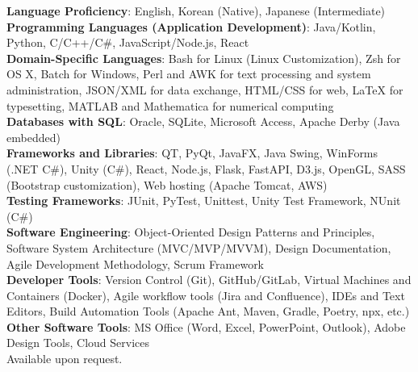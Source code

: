 \textbf{Language Proficiency}: English, Korean (Native), Japanese (Intermediate)\\
\textbf{Programming Languages (Application Development)}: Java/Kotlin, Python, C/C++/C\#, JavaScript/Node.js, React\\
\textbf{Domain-Specific Languages}: Bash for Linux (Linux Customization), Zsh for OS X, Batch for Windows, 
Perl and AWK for text processing and system administration, 
JSON/XML for data exchange, HTML/CSS for web, 
LaTeX for typesetting, MATLAB and Mathematica for numerical computing\\
\textbf{Databases with SQL}: Oracle, SQLite, Microsoft Access, Apache Derby (Java embedded)\\
\textbf{Frameworks and Libraries}: 
QT, PyQt, JavaFX, Java Swing, WinForms (.NET C\#), Unity (C\#), 
React, Node.js, Flask, FastAPI, D3.js, OpenGL, 
SASS (Bootstrap customization), Web hosting (Apache Tomcat, AWS)\\
\textbf{Testing Frameworks}: JUnit, PyTest, 
Unittest, Unity Test Framework, NUnit (C\#)\\
\textbf{Software Engineering}: 
Object-Oriented Design Patterns and Principles, 
Software System Architecture (MVC/MVP/MVVM), Design Documentation, 
Agile Development Methodology, Scrum Framework\\
\textbf{Developer Tools}: Version Control (Git), GitHub/GitLab, 
Virtual Machines and Containers (Docker), 
Agile workflow tools (Jira and Confluence), 
IDEs and Text Editors, 
Build Automation Tools (Apache Ant, Maven, Gradle, Poetry, npx, etc.)\\
\textbf{Other Software Tools}: MS Office (Word, Excel, PowerPoint, Outlook), 
Adobe Design Tools, Cloud Services\\

Available upon request.



